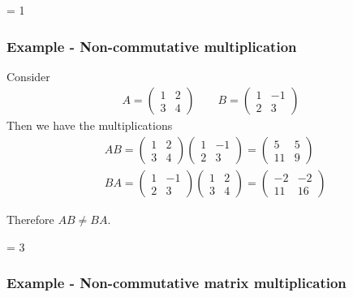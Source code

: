 \documentclass[usenames,dvipsnames,aspectratio=169,10pt]{beamer}
\def \EXAMPLEVERSION {3} %
\numberwithin{equation}{section}
\begin{document}
\ifnum \EXAMPLEVERSION = 1
\begin{frame}
\frametitle{Example - Non-commutative multiplication}\centering
Consider
\begin{align*}
A=
\begin{pmatrix}
1 & 2 \\
3 & 4
\end{pmatrix}
\qquad
B=
\begin{pmatrix}
1 & -1 \\
2 &  3
\end{pmatrix}
\end{align*}
Then we have the multiplications
\begin{align*}
& AB=
\begin{pmatrix}
1 & 2 \\
3 & 4
\end{pmatrix}
\begin{pmatrix}
1 & -1 \\
2 &  3
\end{pmatrix}
=
\begin{pmatrix}
  5 &  5 \\
 11 &  9
\end{pmatrix}
\\
& BA=
\begin{pmatrix}
1 & -1 \\
2 &  3
\end{pmatrix}
\begin{pmatrix}
1 & 2 \\
3 & 4
\end{pmatrix}
=
\begin{pmatrix}
 -2 & -2 \\
 11 & 16
\end{pmatrix}
\end{align*}

Therefore $AB \neq BA$.
\end{frame}
\fi


\ifnum \EXAMPLEVERSION = 3
\begin{frame}
\frametitle{Example - Non-commutative matrix multiplication}
\end{frame}
\fi 
\end{document}
